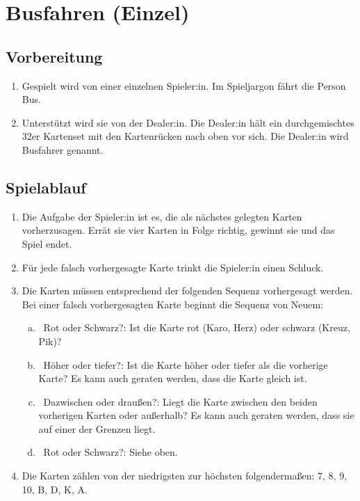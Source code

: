 \chapter{Busfahren (Einzel)}\label{Busfahren_solo}
\section{Vorbereitung}
\begin{enumerate}[label={(\arabic*)}]
    \item
    Gespielt wird von einer einzelnen Spieler:in.
    Im Spieljargon \glqq{}fährt die Person Bus\grqq{}.

    \item
    Unterstützt wird sie von der Dealer:in.
    Die Dealer:in hält ein durchgemischtes 32er Kartenset mit den Kartenrücken nach oben vor sich.
    Die Dealer:in wird \glqq{}Busfahrer\grqq{} genannt.
\end{enumerate}

\section{Spielablauf}
\begin{enumerate}[label={(\arabic*)}]
    \item
    Die Aufgabe der Spieler:in ist es, die als nächstes gelegten Karten vorherzusagen.
    Errät sie vier Karten in Folge richtig, gewinnt sie und das Spiel endet.
    
    \item
    Für jede falsch vorhergesagte Karte trinkt die Spieler:in einen Schluck.
    
    \item
    Die Karten müssen entsprechend der folgenden Sequenz vorhergesagt werden.
    Bei einer falsch vorhergesagten Karte beginnt die Sequenz von Neuem:

    \begin{enumerate}[a.]
        \item
~\glqq{}Rot oder Schwarz?\grqq{}:
        Ist die Karte rot (Karo, Herz) oder schwarz (Kreuz, Pik)?
        \item
~\glqq{}Höher oder tiefer?\grqq{}:
        Ist die Karte höher oder tiefer als die vorherige Karte?
        Es kann auch geraten werden, dass die Karte gleich ist.
        \item
~\glqq{}Dazwischen oder draußen?\grqq{}:
        Liegt die Karte zwischen den beiden vorherigen Karten oder außerhalb?
        Es kann auch geraten werden, dass sie auf einer der Grenzen liegt.
        \item
~\glqq{}Rot oder Schwarz?\grqq{}:
        Siehe oben.
    \end{enumerate}

    \item
    Die Karten zählen von der niedrigsten zur höchsten folgendermaßen: 7, 8, 9, 10, B, D, K, A.
\end{enumerate}

